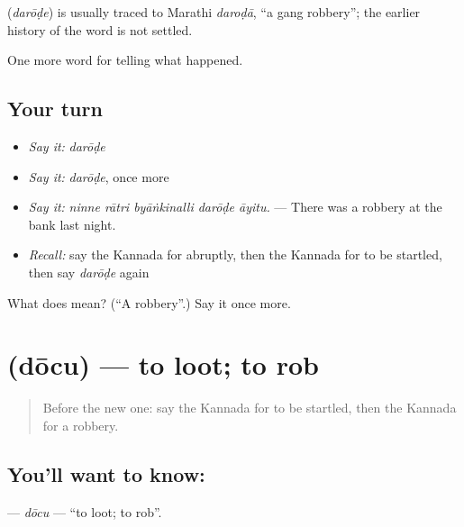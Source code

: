 \begin{cousinweb}
\textbf{} (\emph{darōḍe}) is usually traced to Marathi \emph{daroḍā}, \textquotedblleft{}a gang robbery\textquotedblright{}; the earlier history of the word is not settled.
\end{cousinweb}

\begin{grammarlens}[title={What you've built}]
One more word for telling what happened.
\end{grammarlens}

\subsection*{Your turn}
\begin{itemize}
\raggedright
  \item \emph{Say it:} \emph{darōḍe}
  \item \emph{Say it:} \emph{darōḍe}, once more
  \item \emph{Say it:} \emph{ninne rātri byāṅkinalli darōḍe āyitu.} — There was a robbery at the bank last night.
  \item \emph{Recall:} say the Kannada for abruptly, then the Kannada for to be startled, then say \emph{darōḍe} again
\end{itemize}

\begin{tcolorbox}[breakable,colback=teal!4,colframe=teal!35!black,title={Before you move on}]
What does  mean? (\textquotedblleft{}A robbery\textquotedblright{}.) Say it once more.
\end{tcolorbox}
\section[\texorpdfstring{\kn{ದೋಚು} (dōcu)}{ದೋಚು (dōcu)}]{ (dōcu) — to loot; to rob}

\label{lesson:KA-C328-docu}



\begin{quote}
Before the new one: say the Kannada for to be startled, then the Kannada for a robbery.
\end{quote}

\subsection*{You'll want to know: }
\textbf{} — \emph{dōcu} — \textquotedblleft{}to loot; to rob\textquotedblright{}.

